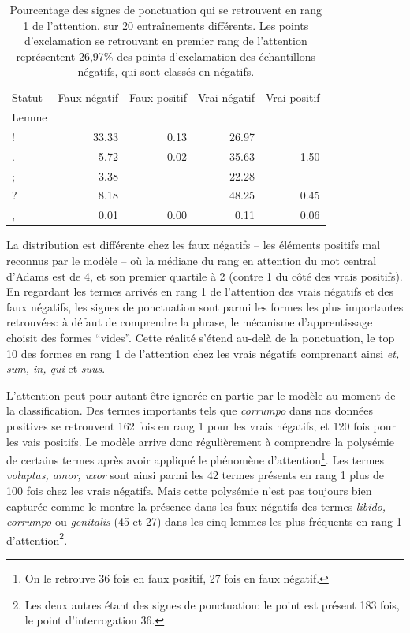\begin{table}[]
    \centering
    \begin{tabular}{l|rrrr}
    \toprule
    Statut &  Faux négatif & Faux positif &  Vrai négatif & Vrai positif \\
    Lemme &               &              &               &              \\
    \midrule
    !     &         33.33 &         0.13 &         26.97 &              \\
    .     &          5.72 &         0.02 &         35.63 &         1.50 \\
    ;     &          3.38 &              &         22.28 &              \\
    ?     &          8.18 &              &         48.25 &         0.45 \\
    ,     &          0.01 &         0.00 &          0.11 &         0.06 \\
    \bottomrule
    \end{tabular}
    \caption{Pourcentage des signes de ponctuation qui se retrouvent en rang 1 de l'attention, sur 20 entraînements différents. Les points d'exclamation se retrouvant en premier rang de l'attention représentent 26,97\% des points d'exclamation des échantillons négatifs, qui sont classés en négatifs.}
    \label{tab:chap4:ponctuation-attention}
\end{table}

La distribution est différente chez les faux négatifs -- les éléments positifs mal reconnus par le modèle -- où la médiane du rang en attention du mot central d'Adams est de 4, et son premier quartile à 2 (contre 1 du côté des vrais positifs). En regardant les termes arrivés en rang 1 de l'attention des vrais négatifs et des faux négatifs, les signes de ponctuation sont parmi les formes les plus importantes retrouvées: à défaut de comprendre la phrase, le mécanisme d'apprentissage choisit des formes ``vides''. Cette réalité s'étend au-delà de la ponctuation, le top 10 des formes en rang 1 de l'attention chez les vrais négatifs comprenant ainsi \textit{et, sum, in, qui} et \textit{suus}. 

L'attention peut pour autant être ignorée en partie par le modèle au moment de la classification. Des termes importants tels que \textit{corrumpo} dans nos données positives se retrouvent 162 fois en rang 1 pour les vrais négatifs, et 120 fois pour les vais positifs. Le modèle arrive donc régulièrement à comprendre la polysémie de certains termes après avoir appliqué le phénomène d'attention\footnote{On le retrouve 36 fois en faux positif, 27 fois en faux négatif.}. Les termes \textit{voluptas, amor, uxor} sont ainsi parmi les 42 termes présents en rang 1 plus de 100 fois chez les vrais négatifs. Mais cette polysémie n'est pas toujours bien capturée comme le montre la présence dans les faux négatifs des termes \textit{libido, corrumpo} ou \textit{genitalis} (45 et 27) dans les cinq lemmes les plus fréquents en rang 1 d'attention\footnote{Les deux autres étant des signes de ponctuation: le point est présent 183 fois, le point d'interrogation 36.}.


